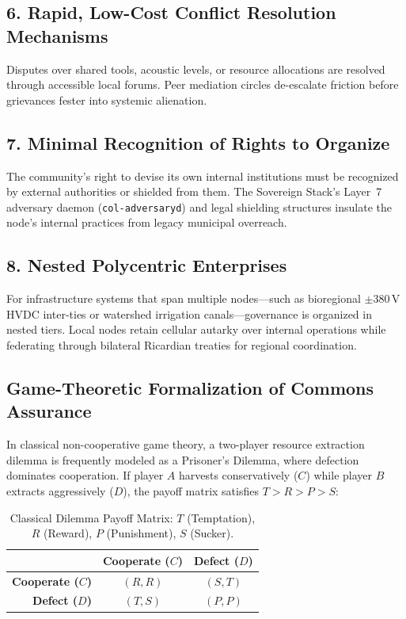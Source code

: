 \subsection{6. Rapid, Low-Cost Conflict Resolution Mechanisms}
Disputes over shared tools, acoustic levels, or resource allocations are resolved through accessible local forums. Peer mediation circles de-escalate friction before grievances fester into systemic alienation.

\subsection{7. Minimal Recognition of Rights to Organize}
The community's right to devise its own internal institutions must be recognized by external authorities or shielded from them. The Sovereign Stack's Layer~7 adversary daemon (\texttt{col-adversaryd}) and legal shielding structures insulate the node's internal practices from legacy municipal overreach.

\subsection{8. Nested Polycentric Enterprises}
For infrastructure systems that span multiple nodes---such as bioregional $\pm 380\,\mathrm{V}$ HVDC inter-ties or watershed irrigation canals---governance is organized in nested tiers. Local nodes retain cellular autarky over internal operations while federating through bilateral Ricardian treaties for regional coordination.

\subsection{Game-Theoretic Formalization of Commons Assurance}
In classical non-cooperative game theory, a two-player resource extraction dilemma is frequently modeled as a Prisoner's Dilemma, where defection dominates cooperation. If player $A$ harvests conservatively ($C$) while player $B$ extracts aggressively ($D$), the payoff matrix satisfies $T > R > P > S$:
\begin{table}[htbp]
\centering
\small
\begin{tabular}{r|cc}
 & \textbf{Cooperate ($C$)} & \textbf{Defect ($D$)} \\
\hline
\textbf{Cooperate ($C$)} & $(R, R)$ & $(S, T)$ \\
\textbf{Defect ($D$)} & $(T, S)$ & $(P, P)$ \\
\end{tabular}
\caption{Classical Dilemma Payoff Matrix: $T$ (Temptation), $R$ (Reward), $P$ (Punishment), $S$ (Sucker).}
\label{tab:commons_dilemma}
\end{table}

